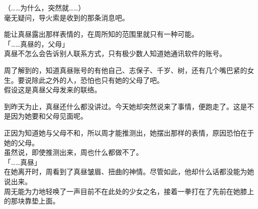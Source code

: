 （……为什么，突然就……）\\

毫无疑问，导火索是收到的那条消息吧。

能让真昼露出那样表情的，在周所知的范围里就只有一种可能。\\

「……真昼的，父母」\\

真昼不怎么会告诉别人联系方式，只有极少数人知道她通讯软件的账号。

周了解到的，知道真昼账号的有他自己、志保子、千岁、树，还有几个嘴巴紧的女生。要说除此之外的人，恐怕也只有她的父母了吧。\\

假设这是真昼父母发来的联络。

到昨天为止，真昼还什么都没讲过。今天她却突然说来了事情，便跑走了。这是不是因为她要和父母见面呢。

正因为知道她与父母不和，所以周才能推测出，她摆出那样的表情，原因恐怕在于她的父母。\\

虽然说，即使推测出来，周也什么都做不了。\\

「……真昼」\\

在她离开时，周看到了真昼皱眉、扭曲的神情。尽管如此，他却什么话都没能为她说出来。\\

周无能为力地轻唤了一声目前不在此处的少女之名，接着一拳打在了先前在她膝上的那块靠垫上面。

